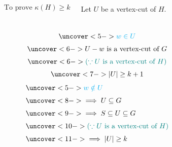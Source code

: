 \begin{frame}{}
  \begin{columns}
      \[
	\text{To prove } \kappa(H) \ge k
      \]

      \pause
      \begin{center}
	Let $U$ be a vertex-cut of $H$. \\[5pt]
      \end{center}
  \end{columns}

  \pause
  \vspace{0.50cm}
  \begin{columns}[t]
      \begin{center}
      \end{center}

      \begin{center}
      \end{center}

      \vspace{-0.60cm}
      \begin{columns}
	  \begin{gather*}
	    \uncover<5->{\cyan{ w \in U }} \\[3pt]
	    \uncover<6->{ U - w \text{ is a vertex-cut of } G } \\[3pt]
	    \uncover<6->{\teal{(\because U \text{ is a vertex-cut of } H)}} \\[3pt]
	    \uncover<7->{ |U| \ge k + 1 }
	  \end{gather*}
	  \begin{align*}
	    &\uncover<5->{\cyan{w \notin U}} \\[3pt]
	    &\uncover<8->{\implies U \subseteq G} \\[3pt]
	    &\uncover<9->{\implies S \subseteq U \subseteq G} \\[3pt]
	    &\uncover<10->{\teal{(\because U \text{ is a vertex-cut of } H)}} \\[3pt]
	    &\uncover<11->{\implies |U| \ge k}
	  \end{align*}
      \end{columns}
  \end{columns}
\end{frame}

